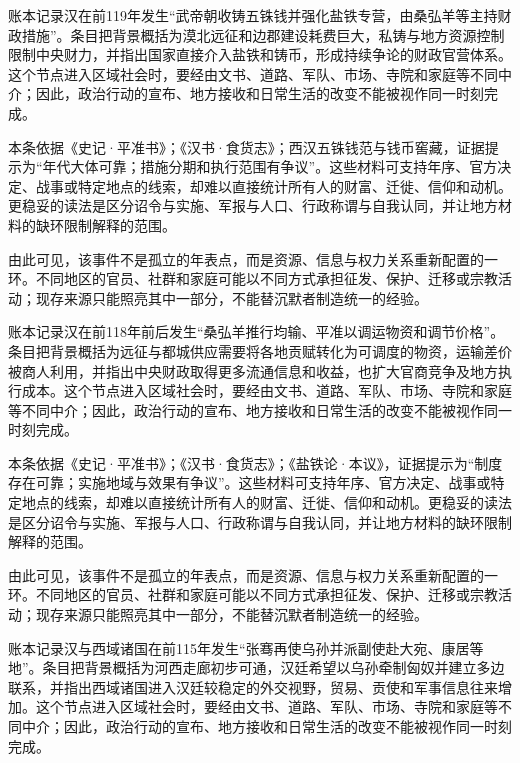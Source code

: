 账本记录汉在前119年发生“武帝朝收铸五铢钱并强化盐铁专营，由桑弘羊等主持财政措施”。条目把背景概括为漠北远征和边郡建设耗费巨大，私铸与地方资源控制限制中央财力，并指出国家直接介入盐铁和铸币，形成持续争论的财政官营体系。这个节点进入区域社会时，要经由文书、道路、军队、市场、寺院和家庭等不同中介；因此，政治行动的宣布、地方接收和日常生活的改变不能被视作同一时刻完成。

本条依据《史记·平准书》；《汉书·食货志》；西汉五铢钱范与钱币窖藏，证据提示为“年代大体可靠；措施分期和执行范围有争议”。这些材料可支持年序、官方决定、战事或特定地点的线索，却难以直接统计所有人的财富、迁徙、信仰和动机。更稳妥的读法是区分诏令与实施、军报与人口、行政称谓与自我认同，并让地方材料的缺环限制解释的范围。

由此可见，该事件不是孤立的年表点，而是资源、信息与权力关系重新配置的一环。不同地区的官员、社群和家庭可能以不同方式承担征发、保护、迁移或宗教活动；现存来源只能照亮其中一部分，不能替沉默者制造统一的经验。

账本记录汉在前118年前后发生“桑弘羊推行均输、平准以调运物资和调节价格”。条目把背景概括为远征与都城供应需要将各地贡赋转化为可调度的物资，运输差价被商人利用，并指出中央财政取得更多流通信息和收益，也扩大官商竞争及地方执行成本。这个节点进入区域社会时，要经由文书、道路、军队、市场、寺院和家庭等不同中介；因此，政治行动的宣布、地方接收和日常生活的改变不能被视作同一时刻完成。

本条依据《史记·平准书》；《汉书·食货志》；《盐铁论·本议》，证据提示为“制度存在可靠；实施地域与效果有争议”。这些材料可支持年序、官方决定、战事或特定地点的线索，却难以直接统计所有人的财富、迁徙、信仰和动机。更稳妥的读法是区分诏令与实施、军报与人口、行政称谓与自我认同，并让地方材料的缺环限制解释的范围。

由此可见，该事件不是孤立的年表点，而是资源、信息与权力关系重新配置的一环。不同地区的官员、社群和家庭可能以不同方式承担征发、保护、迁移或宗教活动；现存来源只能照亮其中一部分，不能替沉默者制造统一的经验。

账本记录汉与西域诸国在前115年发生“张骞再使乌孙并派副使赴大宛、康居等地”。条目把背景概括为河西走廊初步可通，汉廷希望以乌孙牵制匈奴并建立多边联系，并指出西域诸国进入汉廷较稳定的外交视野，贸易、贡使和军事信息往来增加。这个节点进入区域社会时，要经由文书、道路、军队、市场、寺院和家庭等不同中介；因此，政治行动的宣布、地方接收和日常生活的改变不能被视作同一时刻完成。


